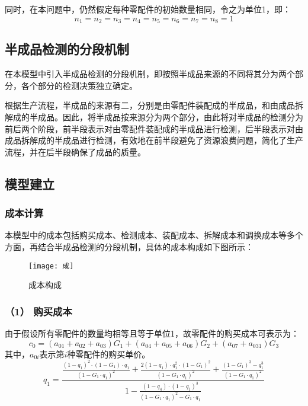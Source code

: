 \documentclass[withoutpreface,bwprint]{cumcmthesis} %
\begin{document}
同时，在本问题中，仍然假定每种零配件的初始数量相同，令之为单位1，即：
\begin{equation}
	n_1 = n_2 = n_3 = n_4 = n_5 = n_6 = n_7 = n_8 = 1
	\end{equation}
	
\subsection{半成品检测的分段机制}
在本模型中引入半成品检测的分段机制，即按照半成品来源的不同将其分为两个部分，各个部分的检测决策独立确定。

根据生产流程，半成品的来源有二，分别是由零配件装配成的半成品，和由成品拆解成的半成品。因此，将半成品按来源分为两个部分，由此将对半成品的检测分为前后两个阶段，前半段表示对由零配件装配成的半成品进行检测，后半段表示对由成品拆解成的半成品进行检测，有效地在前半段避免了资源浪费问题，简化了生产流程，并在后半段确保了成品的质量。

\subsection{模型建立}
\subsubsection{成本计算}
本模型中的成本包括购买成本、检测成本、装配成本、拆解成本和调换成本等多个方面，再结合半成品检测的分段机制，具体的成本构成如下图所示：

\begin{figure}[htbp]  %
	\centering  %
	\texttt{[image: 成]} %
	\caption{成本构成}  
\end{figure}

\subsubsection*{（1） 购买成本}
由于假设所有零配件的数量均相等且等于单位1，故零配件的购买成本可表示为：
\begin{equation}
	c_0=\left(a_{01}+a_{02}+a_{03}\right) G_1+\left(a_{04}+a_{05}+a_{06}\right) G_2+\left(a_{07}+a_{031}\right) G_3
\end{equation}
其中，$a_{0i}$表示第$i$种零配件的购买单价。\begin{equation}
	q_1=\frac{\frac{\left(1-q_1\right)^2 \cdot\left(1-G_1\right) \cdot q_1}{\left(1-G_1 \cdot q_1\right)^2}+\frac{2\left(1-q_1\right) \cdot q_1^2 \cdot\left(1-G_1\right)^2}{\left(1-G_1 \cdot q_1\right)^2}+\frac{\left(1-G_1\right)^3-q_1^3}{\left(1-G_1 \cdot q_1\right)^2}}{1-\frac{\left(1-q_4\right) \cdot\left(1-q_1\right)^3}{\left(1-G_1 \cdot q_1\right)^2-G_1 \cdot q_1}}
\end{equation}
\end{document}
